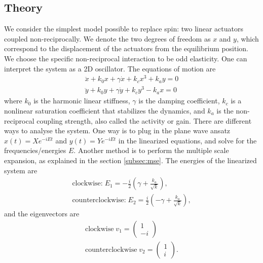 \documentclass[11pt, a4paper]{article} %
\newcommand{\xd}{\dot{x}}
\newcommand{\xdd}{\ddot{x}}
\newcommand{\yd}{\dot{y}}
\newcommand{\ydd}{\ddot{y}}
\begin{document}
\subsection{Theory}
\label{subsec:1unit_theory}

We consider the simplest model possible to replace spin: two linear actuators 
coupled non-reciprocally. We denote the two degrees of freedom as $x$ and $y$, which correspond to the displacement of the 
actuators from the equilibrium position. We choose the specific non-reciprocal interaction to be odd elasticity. %
One can interpret the system as a 2D oscillator. 
The equations of motion are
    \begin{align}
        \xdd +k_0x +  \gamma \xd + k_cx^3 + k_ay = 0 \label{eq_1osc_x} \\ %
        \ydd +k_0y +  \gamma \yd + k_cy^3 - k_ax = 0 \label{eq_1osc_y}
    \end{align}
where \( k_0 \) is the harmonic linear stiffness, \( \gamma \) is the damping coefficient, $k_c$ is a nonlinear saturation coefficient 
that stabilizes the dynamics, and \( k_a \) is the non-reciprocal coupling strength, also called the activity or gain. 
There are different ways to analyse the system. One way is to plug in the plane wave ansatz 
\( x(t) = X e^{-iEt} \) and \( y(t) = Y e^{-iEt} \) in the linearized equations, and solve for the frequencies/energies $E$. 
Another method is to perform the multiple scale expansion, as explained in the section \ref{subsec:mse}.
    The energies of the linearized system are 
    \begin{align}
        \text{clockwise:} \; E_1 = -\frac{i}{2}\left(\gamma + \frac{k_a}{\sqrt{k}}\right), \label{eq_1osc_e1}\\ %
        \text{counterclockwise:} \; E_2 = \frac{i}{2}\left(-\gamma + \frac{k_a}{\sqrt{k}}\right), \label{eq_1osc_e2}
    \end{align}
    and the eigenvectors are 
    \begin{align}
        \text{clockwise} \; v_1 = \begin{pmatrix}
        1 \\ -i
        \end{pmatrix} \label{eq_1osc_v1} \\ %
        \text{counterclockwise} \; v_2 = \begin{pmatrix}
        1 \\ i
        \end{pmatrix} \label{eq_1osc_v2}.
    \end{align}
\end{document}
